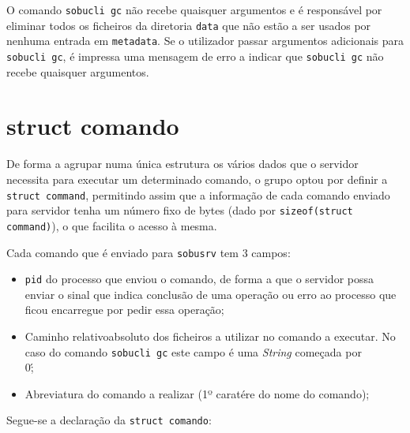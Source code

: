 \documentclass[a4paper,12pt,titlepage,portuguese]{article}
\begin{document}
O comando \texttt{sobucli gc} não recebe quaisquer argumentos e é responsável por eliminar todos os ficheiros da diretoria \texttt{data\/} que não estão a ser usados por nenhuma entrada em \texttt{\/metadata}. Se o utilizador passar argumentos adicionais para \texttt{sobucli gc}, é impressa uma mensagem de erro a indicar que \texttt{sobucli gc} não recebe quaisquer argumentos.

\section{struct comando}

De forma a agrupar numa única estrutura os vários dados que o servidor necessita para executar um determinado comando, o grupo optou por definir a \texttt{struct command}, permitindo assim que a informação de cada comando enviado para servidor tenha um número fixo de bytes (dado por \texttt{sizeof(struct command)}), o que facilita o acesso à mesma. 

Cada comando que é enviado para \texttt{sobusrv} tem 3 campos:

	\begin{itemize}
		\item \texttt{pid} do processo que enviou o comando, de forma a que o servidor possa enviar o sinal que indica conclusão de uma operação ou erro ao processo que ficou encarregue por pedir essa operação;
		\item Caminho relativo\/absoluto dos ficheiros a utilizar no comando a executar. No caso do comando \texttt{sobucli gc} este campo é uma \emph{String} começada por \'\\0\';
		\item Abreviatura do comando a realizar (1º caratére do nome do comando); 
	\end{itemize}

	Segue-se a declaração da \texttt{struct comando}:
\end{document}
